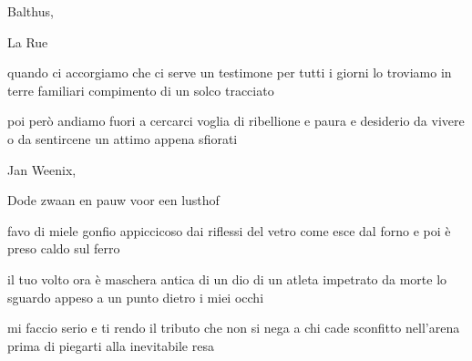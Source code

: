 \clearpage


\begin{artItem}
	Balthus, \begin{otherlanguage}{french}%
		La Rue%
	\end{otherlanguage}
\end{artItem}

\begin{poem}
	\begin{stanza}
		quando ci accorgiamo che ci serve\verseline
		un testimone per tutti i giorni\verseline
		lo troviamo in terre familiari\verseline
		compimento di un solco tracciato
	\end{stanza}

	\begin{stanza}
		poi però andiamo fuori a cercarci\verseline
		voglia di ribellione e paura\verseline
		e desiderio\verseline
		da vivere o da sentircene un attimo\verseline
		appena sfiorati
	\end{stanza}
\end{poem}

\clearpage


\begin{artItem}
	Jan Weenix, \begin{otherlanguage}{dutch}%
		Dode zwaan en pauw voor een lusthof%
	\end{otherlanguage}
\end{artItem}

\begin{poem}
	\begin{stanza}
		favo di miele\verseline
		gonfio appiccicoso\verseline
		dai riflessi del vetro\verseline
		come esce dal forno\verseline
		e poi è preso\verseline
		caldo sul ferro
	\end{stanza}

	\begin{stanza}
		il tuo volto ora è maschera\verseline
		antica di un dio\verseline
		di un atleta\verseline
		impetrato da morte\verseline
		lo sguardo appeso a un punto\verseline
		dietro i miei occhi
	\end{stanza}

	\begin{stanza}
		mi faccio serio e ti rendo\verseline
		il tributo che non si nega\verseline
		a chi cade sconfitto nell'arena\verseline
		prima di piegarti alla\verseline
		inevitabile resa
	\end{stanza}
\end{poem}

